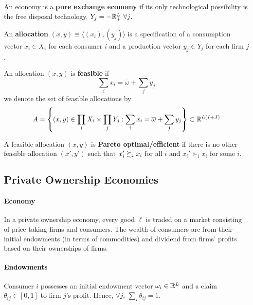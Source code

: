 \documentclass{report}
\begin{document}
		\begin{definition}
			An economy is a \textbf{pure exchange economy} if its only technological possibility is the free disposal technology, $Y_j = -\mathbb{R}^L_+\ \forall j$. 
		\end{definition}
		
		\begin{definition}[16.B.1.a]
			An \textbf{allocation} $(x, y) \equiv \langle (x_i), (y_j) \rangle$ is a specification of a consumption vector $x_i \in X_i$ for each consumer $i$ and a production vector $y_j \in Y_j$ for each firm $j$.
		\end{definition}
		
		\begin{definition}[16.B.1.b]
			An allocation $(x, y)$ is \textbf{feasible} if 
			\begin{equation}
				\sum_i x_i = \overline{\omega} + \sum_j y_j
			\end{equation}
			we denote the set of feasible allocations by 
			\begin{equation}
				A = \left\{(x, y) \in \prod_i X_i \times \prod_j Y_j: \sum_i x_i = \overline{\omega} + \sum_j y_j \right\} \subset \mathbb{R}^{L(I+J)}
			\end{equation}
		\end{definition}
		
		\begin{definition}[16.B.2]
			A feasible allocation $(x, y)$ is \textbf{Pareto optimal/efficient} if there is no other feasible allocation $(x', y')$ such that $x_i' \succsim_i x_i$ for all $i$ and $x_i' \succ_i x_i$ for some $i$.
		\end{definition}
		
		\subsection{Private Ownership Economies}
		\paragraph{Economy} In a private ownership economy, every good $\ell$ is traded on a market consisting of price-taking firms and consumers. The wealth of consumers are from their initial endowments (in terms of commodities) and dividend from firms' profits based on their ownerships of firms.
		
		\paragraph{Endowments} Consumer $i$ possesses an initial endowment vector $\omega_i \in \mathbb{R}^L$ and a claim $\theta_{ij} \in [0, 1]$ to firm $j$'s profit. Hence, $\forall j,\ \sum_i \theta_{ij} = 1$.
		
\end{document}
